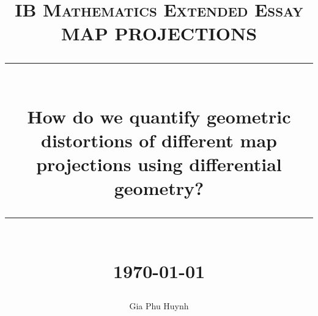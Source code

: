 \documentclass[11pt]{article}
\title{ 
    \normalsize \textsc{IB Mathematics Extended Essay} \\ [2.5cm]

	\LARGE MAP PROJECTIONS
	\rule{\linewidth}{0.5pt} \\
	\Large \textbf{How do we quantify geometric distortions of different map projections using differential geometry?}
	\rule{\linewidth}{1pt} \\ [1cm]
	\normalsize \today \vspace*{5\baselineskip}
}
\date{}
\author{Gia Phu Huynh}
\begin{document}
\maketitle

\pagebreak
\tableofcontents

\pagebreak
\raggedright

\end{document}
